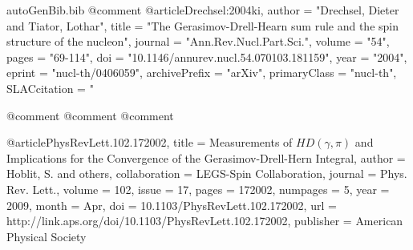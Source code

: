 \begin{filecontents*}{autoGenBib.bib}
@comment %
@article{Drechsel:2004ki,
      author         = "Drechsel, Dieter and Tiator, Lothar",
      title          = "{The Gerasimov-Drell-Hearn sum rule and the spin
                        structure of the nucleon}",
      journal        = "Ann.Rev.Nucl.Part.Sci.",
      volume         = "54",
      pages          = "69-114",
      doi            = "10.1146/annurev.nucl.54.070103.181159",
      year           = "2004",
      eprint         = "nucl-th/0406059",
      archivePrefix  = "arXiv",
      primaryClass   = "nucl-th",
      SLACcitation   = "%
}

@comment %
@comment %
@comment %

@article{PhysRevLett.102.172002,
  title = {Measurements of $HD(\gamma, \pi)$ and Implications for the Convergence of the Gerasimov-Drell-Hern Integral},
  author = {Hoblit, S. and others},
  collaboration = {LEGS-Spin Collaboration},
  journal = {Phys. Rev. Lett.},
  volume = {102},
  issue = {17},
  pages = {172002},
  numpages = {5},
  year = {2009},
  month = {Apr},
  doi = {10.1103/PhysRevLett.102.172002},
  url = {http://link.aps.org/doi/10.1103/PhysRevLett.102.172002},
  publisher = {American Physical Society}
}



\end{filecontents*}
